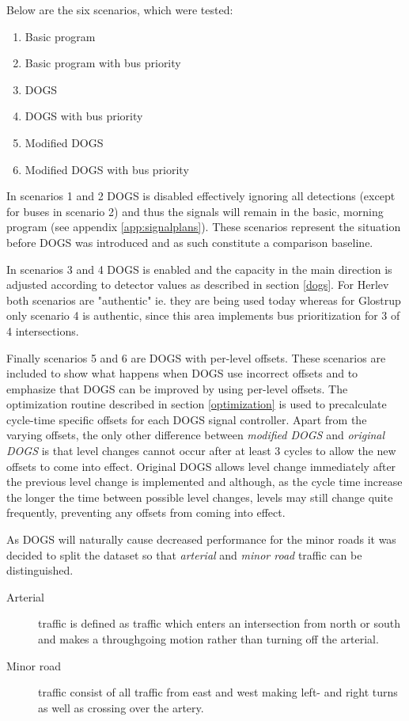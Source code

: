 Below are the six scenarios, which were tested:

\begin{enumerate}
\item Basic program
\item Basic program with bus priority
\item DOGS
\item DOGS with bus priority
\item Modified DOGS
\item Modified DOGS with bus priority
\end{enumerate}

In scenarios 1 and 2 DOGS is disabled effectively ignoring all detections (except for buses in scenario 2) and thus the signals will remain in the basic, morning program (see appendix \ref{app:signalplans}). These scenarios represent the situation before DOGS was introduced and as such constitute a comparison baseline.

In scenarios 3 and 4 DOGS is enabled and the capacity in the main direction is adjusted according to detector values as described in section \ref{dogs}. For Herlev both scenarios are "authentic" ie. they are being used today whereas for Glostrup only scenario 4 is authentic, since this area implements bus prioritization for 3 of 4 intersections.

Finally scenarios 5 and 6 are DOGS with per-level offsets. These scenarios are included to show what happens when DOGS use incorrect offsets and to emphasize that DOGS can be improved by using per-level offsets. 
The optimization routine described in section \ref{optimization} is used to precalculate cycle-time specific offsets for each DOGS signal controller. 
Apart from the varying offsets, the only other difference between \textit{modified DOGS} and \textit{original DOGS} is that level changes cannot occur after at least 3 cycles to allow the new offsets to come into effect. Original DOGS allows level change immediately after the previous level change is implemented and although, as the cycle time increase the longer the time between possible level changes, levels may still change quite frequently, preventing any offsets from coming into effect.

As DOGS will naturally cause decreased performance for the minor roads it was decided to split the dataset so that \textit{arterial} and \textit{minor road} traffic can be distinguished. 

\begin{description}
\item[Arterial] traffic is defined as traffic which enters an intersection from north or south and makes a throughgoing motion rather than turning off the arterial. 
\item[Minor road] traffic consist of all traffic from east and west making left- and right turns as well as crossing over the artery.
\end{description}

